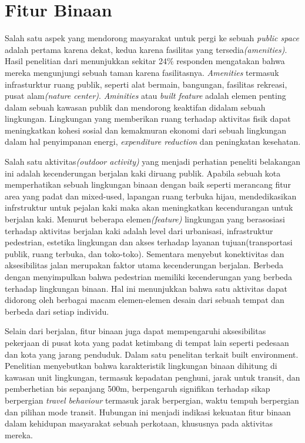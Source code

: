 \documentclass[../projects/thesis.tex]{subfiles}
\begin{document}
\section{Fitur Binaan }

Salah satu aspek yang mendorong masyarakat untuk pergi ke sebuah \textit{public space} adalah pertama karena dekat, kedua karena fasilitas yang tersedia\textit{(amenities)}. Hasil penelitian dari \cite{campbell2016social} menunjukkan sekitar 24\% responden mengatakan bahwa mereka mengunjungi sebuah taman karena fasilitasnya. \textit{Amenities} termasuk infrasturktur ruang publik, seperti alat bermain, bangungan, fasilitas rekreasi, pusat alam\textit{(nature center)}. \textit{Aminities} atau \textit{built feature} adalah elemen penting dalam sebuah kawasan publik dan mendorong keaktifan didalam sebuah lingkungan.
Lingkungan yang memberikan ruang terhadap aktivitas fisik dapat meningkatkan kohesi sosial dan kemakmuran ekonomi dari sebuah lingkungan dalam hal penyimpanan energi, \textit{expenditure reduction} dan peningkatan kesehatan\citep{dovey2020walkability,klann2019translating}.

Salah satu aktivitas\textit{(outdoor activity)} yang menjadi perhatian peneliti belakangan ini adalah kecenderungan berjalan kaki diruang publik.
Apabila sebuah kota memperhatikan sebuah lingkungan binaan dengan baik seperti merancang fitur area yang padat dan mixed-used, lapangan ruang terbuka hijau, mendedikasikan infrstruktur untuk pejalan kaki maka akan meningkatkan kecendurangan untuk berjalan kaki\citep{cheng2020examining,cao2010neighborhood,cerin2014ageing}. Menurut \citep{cerin2014ageing} beberapa elemen\textit{(feature)} lingkungan yang berasosiasi terhadap aktivitas berjalan kaki adalah level dari urbanisasi, infrastruktur pedestrian, estetika lingkungan dan akses terhadap layanan tujuan(transportasi publik, ruang terbuka, dan toko-toko). Sementara \cite{ramakreshnan2020motivations} menyebut konektivitas dan aksesibilitas jalan merupakan faktor utama kecenderungan berjalan. Berbeda dengan \cite{liu2020impact} menyimpulkan bahwa pedestrian memiliki kecenderungan yang berbeda terhadap lingkungan binaan.
Hal ini menunjukkan bahwa satu aktivitas dapat didorong oleh berbagai macam elemen-elemen desain dari sebuah tempat dan berbeda dari setiap individu.

Selain dari berjalan, fitur binaan juga dapat mempengaruhi aksesibilitas pekerjaan di pusat kota yang padat ketimbang di tempat lain seperti pedesaan dan kota yang jarang penduduk\citep{zhu2020built}.
Dalam satu penelitan terkait built environment. Penelitian \citep{yu2019exploring}  menyebutkan bahwa karakteristik lingkungan binaan dihitung di kawasan unit lingkungan, termasuk kepadatan penghuni, jarak untuk transit, dan pemberhetian bis sepanjang 500m, berpengaruh signifikan terhadap sikap berpergian \textit{travel behaviour} termasuk jarak berpergian, waktu tempuh berpergian dan pilihan mode transit. Hubungan ini menjadi indikasi kekuatan fitur binaan dalam kehidupan masyarakat sebuah perkotaan, khususnya pada aktivitas mereka.
\end{document}
